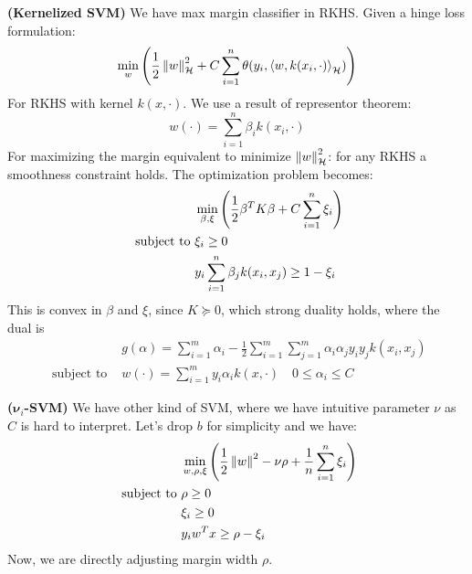 \begin{definition}{\textbf{(Kernelized SVM)}}
    We have max margin classifier in RKHS. Given a hinge loss formulation:
    \begin{equation*}
        \min_w \left( \frac{1}{2}\left\lVert w\right\rVert^2_\mathcal{H} + C\sum^n_{i=1}\theta(y_i, \left\langle w, k(x_i,\cdot) \right\rangle_\mathcal{H}) \right)
    \end{equation*}
    For RKHS with kernel $k(x,\cdot)$. We use a result of representor theorem:
    \begin{equation*}
        w(\cdot) = \sum^n_{i=1}\beta_ik(x_i,\cdot)
    \end{equation*}
    For maximizing the margin equivalent to minimize $\left\lVert w\right\rVert^2_\mathcal{H}$: for any RKHS a smoothness constraint holds. The optimization problem becomes:
    \begin{equation*}
    \begin{aligned}
        &\min_{\beta, \xi}\left( \frac{1}{2}\beta^TK\beta + C\sum^n_{i=1}\xi_i \right) \\
        \text{ subject to }&\begin{aligned}[t]
            &\xi_i\ge0 \\    
            &y_i\sum^n_{i=1}\beta_jk(x_i, x_j)\ge1-\xi_i
        \end{aligned}    
    \end{aligned}
    \end{equation*}
    This is convex in $\beta$ and $\xi$, since $K\succeq0$, which strong duality holds, where the dual is 
    \begin{equation*}
    \begin{aligned}
        &g(\alpha) = \sum^m_{i=1}\alpha_i - \frac{1}{2}\sum^m_{i=1}\sum^m_{j=1}\alpha_i\alpha_jy_iy_jk(x_i, x_j) \\
        \text{ subject to }& w(\cdot) = \sum^m_{i=1}y_i\alpha_ik(x,\cdot) \quad 0\le \alpha_i\le C
    \end{aligned}
    \end{equation*}
\end{definition}

\begin{definition}{\textbf{($\boldsymbol{\nu}_i$-SVM)}}
    We have other kind of SVM, where we have intuitive parameter $\nu$ as $C$ is hard to interpret. Let's drop $b$ for simplicity and we have:
    \begin{equation*}
    \begin{aligned}
        &\min_{w,\rho,\xi}\left( \frac{1}{2}\left\lVert w\right\rVert^2 - \nu\rho + \frac{1}{n}\sum^n_{i=1}\xi_i \right) \\
        \text{ subject to }&\begin{aligned}[t]
            &\rho\ge0 \\
            &\xi_i\ge0 \\
            &y_iw^Tx\ge\rho-\xi_i
        \end{aligned}
    \end{aligned}
    \end{equation*}
    Now, we are directly adjusting margin width $\rho$.
\end{definition}

